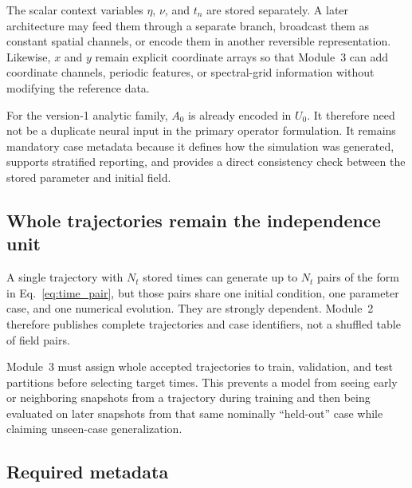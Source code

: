\documentclass[11pt]{article}
\begin{document}
The scalar context variables $\eta$, $\nu$, and $t_n$ are stored separately. A later architecture may feed them through a separate branch, broadcast them as constant spatial channels, or encode them in another reversible representation. Likewise, $x$ and $y$ remain explicit coordinate arrays so that Module~3 can add coordinate channels, periodic features, or spectral-grid information without modifying the reference data.

For the version-1 analytic family, $A_0$ is already encoded in $U_0$. It therefore need not be a duplicate neural input in the primary operator formulation. It remains mandatory case metadata because it defines how the simulation was generated, supports stratified reporting, and provides a direct consistency check between the stored parameter and initial field.

\subsection{Whole trajectories remain the independence unit}

A single trajectory with $N_t$ stored times can generate up to $N_t$ pairs of the form in Eq.~\eqref{eq:time_pair}, but those pairs share one initial condition, one parameter case, and one numerical evolution. They are strongly dependent. Module~2 therefore publishes complete trajectories and case identifiers, not a shuffled table of field pairs.

Module~3 must assign whole accepted trajectories to train, validation, and test partitions before selecting target times. This prevents a model from seeing early or neighboring snapshots from a trajectory during training and then being evaluated on later snapshots from that same nominally ``held-out'' case while claiming unseen-case generalization.

\subsection{Required metadata}
\end{document}
